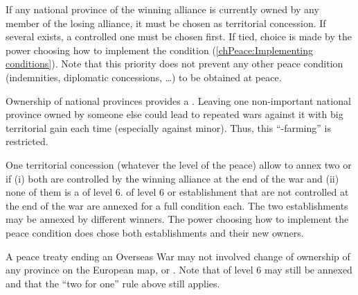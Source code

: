 \aparag[Priority] If any national province of the winning alliance is
currently owned by any member of the losing alliance, it must be chosen as
territorial concession.
\bparag If several exists, a controlled one must be chosen first.
\bparag If tied, choice is made by the power choosing how to implement the
condition (\ref{chPeace:Implementing conditions}).
\bparag Note that this priority does not prevent any other peace condition
(indemnities, diplomatic concessions, \ldots) to be obtained at peace.

\begin{designnote}
  Ownership of national provinces provides a \CB. Leaving one non-important
  national province owned by someone else could lead to repeated wars against
  it with big territorial gain each time (especially against minor). Thus,
  this ``\CB-farming'' is restricted.
\end{designnote}

\bparag One territorial concession (whatever the level of the peace) allow to
annex two \COL or \TP if (i) both are controlled by the winning alliance at
the end of the war and (ii) none of them is a \COL of level 6.
\bparag \COL of level 6 or establishment that are not controlled at the end of
the war are annexed for a full condition each.
\bparag The two establishments may be annexed by different winners.
\bparag The power choosing how to implement the peace condition does chose
both establishments and their new owners.

A peace treaty ending an Overseas War may not involved change of ownership of
any province on the European map,  or .
\bparag Note that \COL of level 6 may still be annexed and that the ``two for
one'' rule above still applies.

